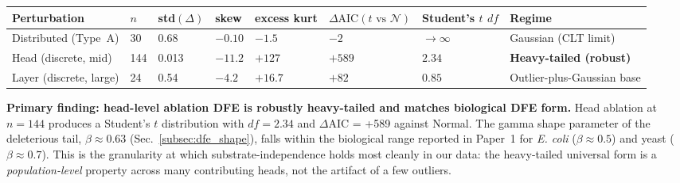 \documentclass{article}
\begin{document}
\begin{center}
\begin{tabular}{llllllll}
\toprule
Perturbation & $n$ & std$(\Delta)$ & skew & excess kurt & $\Delta\text{AIC}(t \text{ vs } \mathcal{N})$ & Student's $t$ $df$ & Regime \\
\midrule
Distributed (Type~A) & 30 & 0.68 & $-0.10$ & $-1.5$ & $-2$ & $\to\infty$ & Gaussian (CLT limit) \\
Head (discrete, mid) & 144 & 0.013 & $-11.2$ & $+127$ & $+589$ & $2.34$ & \textbf{Heavy-tailed (robust)} \\
Layer (discrete, large) & 24 & 0.54 & $-4.2$ & $+16.7$ & $+82$ & $0.85$ & Outlier-plus-Gaussian base \\
\bottomrule
\end{tabular}
\end{center}

\textbf{Primary finding: head-level ablation DFE is robustly heavy-tailed and matches biological DFE form.} Head ablation at $n = 144$ produces a Student's $t$ distribution with $df = 2.34$ and $\Delta\text{AIC}$ = +589 against Normal. The gamma shape parameter of the deleterious tail, $\beta \approx 0.63$ (Sec.~\ref{subsec:dfe_shape}), falls within the biological range reported in Paper~1 for \emph{E. coli} ($\beta \approx 0.5$) and yeast ($\beta \approx 0.7$). This is the granularity at which substrate-independence holds most cleanly in our data: the heavy-tailed universal form is a \emph{population-level} property across many contributing heads, not the artifact of a few outliers.
\end{document}
